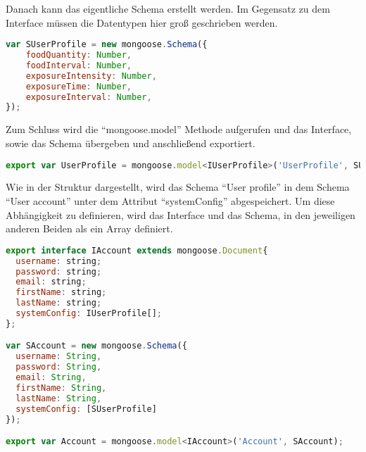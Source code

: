 Danach kann das eigentliche Schema erstellt werden. Im Gegensatz zu dem Interface müssen die Datentypen hier groß geschrieben werden.

\begin{lstlisting}[language=Javascript, caption=Erstellen des Schemas]
var SUserProfile = new mongoose.Schema({
	foodQuantity: Number, 
	foodInterval: Number,
	exposureIntensity: Number,
	exposureTime: Number, 
	exposureInterval: Number, 
});
\end{lstlisting}

\newpage

Zum Schluss wird die "`mongoose.model"' Methode aufgerufen und das Interface, sowie das Schema übergeben und anschließend exportiert.

\begin{lstlisting}[language=Javascript, caption=Exportieren des Schemas]
export var UserProfile = mongoose.model<IUserProfile>('UserProfile', SUserProfile);
\end{lstlisting}

Wie in der Struktur dargestellt, wird das Schema "`User profile"' in dem Schema "`User account"' unter dem Attribut "`systemConfig"' abgespeichert. Um diese Abhängigkeit zu definieren, wird das Interface und das Schema, in den jeweiligen anderen Beiden als ein Array definiert.

\begin{lstlisting}[language=Javascript, caption=Erstellen des Schemas User account]
export interface IAccount extends mongoose.Document{
  username: string;
  password: string;
  email: string;
  firstName: string;
  lastName: string;
  systemConfig: IUserProfile[];
};

var SAccount = new mongoose.Schema({
  username: String,
  password: String,
  email: String,
  firstName: String,
  lastName: String,
  systemConfig: [SUserProfile]
});

export var Account = mongoose.model<IAccount>('Account', SAccount);
\end{lstlisting}




